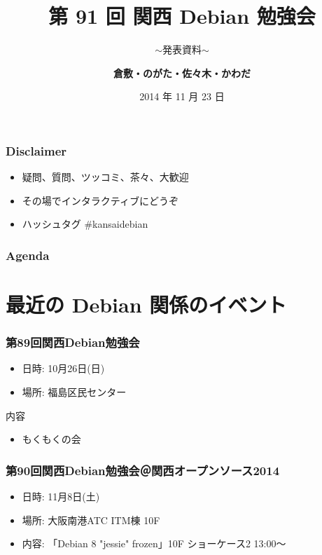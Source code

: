 \documentclass[cjk,dvipdfmx,10pt,compress,%
hyperref={bookmarks=true,bookmarksnumbered=true,bookmarksopen=false,%
colorlinks=false,%
pdftitle={第 91 回 関西 Debian 勉強会},%
pdfauthor={倉敷・のがた・佐々木・かわだ},%
pdfsubject={資料},%
}]{beamer}
\title{第 91 回 関西 Debian 勉強会}
\subtitle{$\sim$発表資料$\sim$}
\author[かわだ てつたろう]{{\large\bf 倉敷・のがた・佐々木・かわだ}}
\institute[Debian JP]{{\normalsize\tt 関西 Debian 勉強会}}
\date{{\small 2014 年 11 月 23 日}}
\begin{document}
\settitleslide
\begin{frame}
\titlepage
\end{frame}
\setdefaultslide

\begin{frame}[fragile]
  \frametitle{Disclaimer}
  \begin{itemize}
  \item 疑問、質問、ツッコミ、茶々、\alert{大歓迎}
  \item その場でインタラクティブにどうぞ
  \item ハッシュタグ \#kansaidebian
\end{itemize}
\end{frame}

\begin{frame}[fragile]
\frametitle{Agenda}

\tableofcontents

\end{frame}

\section{最近の Debian 関係のイベント}


\begin{frame}[fragile]
  \frametitle{第89回関西Debian勉強会}
  \begin{itemize}
  \item 日時: 10月26日(日)
  \item 場所: 福島区民センター
  \end{itemize}
  \begin{block}{内容}
    \begin{itemize}
    \item もくもくの会
    \end{itemize}
  \end{block}
\end{frame}

\begin{frame}[fragile]
  \frametitle{第90回関西Debian勉強会＠関西オープンソース2014}
  \begin{itemize}
  \item 日時: 11月8日(土)
  \item 場所: 大阪南港ATC ITM棟 10F
  \item 内容: 「Debian 8 "jessie" frozen」10F ショーケース2 13:00〜
  \end{itemize}
\end{frame}
\end{document}
